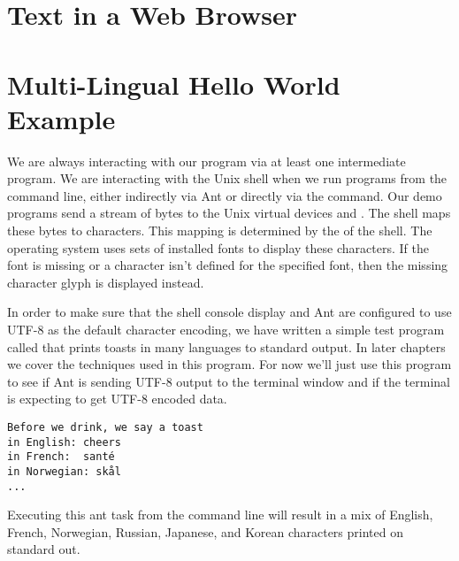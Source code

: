 \section{Text in a Web Browser}


\section{Multi-Lingual Hello World Example}\label{section:ant-console-config-utf8}

We are always interacting with our program via at least one intermediate program.
We are interacting with the Unix shell when we run programs from the command line,
either indirectly via Ant or directly via the  command.
Our demo programs send a stream of bytes to the Unix virtual devices
 and . 
The shell maps these bytes to characters.
This mapping is determined by the  of the shell.
The operating system uses sets of installed fonts to display these characters.
If the font is missing or a character isn't defined for the specified font,
then the missing character glyph is displayed instead.

In order to make sure that the shell console display and Ant are
configured to use UTF-8 as the default character encoding, we have written
a simple test program called  that prints toasts in many
languages to standard output.
In later chapters we cover the techniques used in this program.
For now we'll just use this program to see if
Ant is sending UTF-8 output to the terminal window and if the
terminal is expecting to get UTF-8 encoded data.
\begin{verbatim} 
Before we drink, we say a toast 
in English: cheers  
in French:  santé
in Norwegian: skål
...
\end{verbatim}
Executing this ant task from the command line will result in a mix of
English, French, Norwegian, Russian, Japanese, and Korean characters
printed on standard out.

